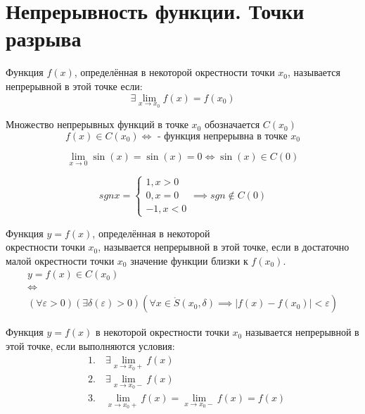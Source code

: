 \section{Непрерывность функции. Точки разрыва}

\begin{definition}
  Функция $f(x)$, определённая в некоторой окрестности точки $x_0$, называется непрерывной в этой точке если: \[
    \exists \lim_{x \to x_0} f(x) = f(x_0)
  \]
\end{definition}

Множество непрерывных функций в точке $x_0$ обозначается $C(x_0)$\[
  f(x) \in C(x_0) \iff \text{ - функция непрерывна в точке } x_0
\] 

\begin{eg}
  \[
  \lim_{x \to 0} \sin(x) = \sin(x) = 0 \iff \sin(x) \in C(0)
  \] 
\end{eg}
\begin{eg}
  \[
  sgn x = \begin{cases}
    1, x > 0 \\
    0, x = 0 \\
    -1, x < 0
  \end{cases} \implies
  sgn \not \in C(0)
  \]
\end{eg}

\begin{definition}
  Функция $y = f(x)$, определённая в некоторой \\ окрестности точки $x_0$, называется непрерывной в этой точке, если в достаточно малой окрестности точки $x_0$ значение функции близки к $f(x_0)$.
  \begin{gather*}
    y = f(x) \in C(x_0) \\
    \iff \\
    (\forall  \varepsilon > 0)(\exists \delta(\varepsilon) > 0)(\forall x \in \mathring{S}(x_0, \delta) \implies |f(x) - f(x_0)| < \varepsilon)
  \end{gather*}
\end{definition}

\begin{definition}
  Функция $y = f(x)$ в некоторой окрестности точки $x_0$ называется непрерывной в этой точке, если выполняются условия:
  \begin{align*}
    &1. \quad \exists \lim_{x \to x_0+} f(x) \\
    &2. \quad \exists \lim_{x \to x_0-} f(x) \\
    &3. \quad \lim_{x \to x_0+} f(x) = \lim_{x \to x_0-} f(x) = f(x) \\
  \end{align*}
\end{definition}

